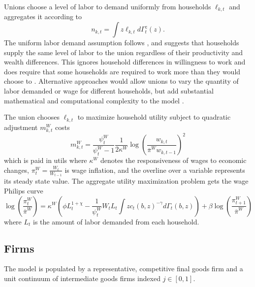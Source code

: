 Unions choose a level of labor to demand uniformly from households $\ell_{k, t}$ and aggregates it according to
\begin{equation*}
    n_{k, t} = \int z \ell_{k, t} d \Gamma_t^z (z).
\end{equation*}
The uniform labor demand assumption follows \textcite{auclert2023mpcs}, and suggests that households supply the same level of labor to the union regardless of their productivity and wealth differences. This ignores household differences in willingness to work and does require that some households are required to work more than they would choose to \autocite{gerke2024household}. Alternative approaches would allow unions to vary the quantity of labor demanded or wage for different households, but add substantial mathematical and computational complexity to the model \autocite{gerke2024household}.

The union chooses $\ell_{k, t}$ to maximize household utility subject to quadratic adjustment $m_{k, t}^W$ costs
\begin{equation*}
    m_{k, t}^W = \frac{\psi_t^W}{\psi_t^W - 1} \frac{1}{2 \kappa^W} \log\left(\frac{w_{k, t}}{\overline{\pi}^W w_{k, t-1}}\right)^2
\end{equation*}
which is paid in utils where $\kappa^W$ denotes the responsiveness of wages to economic changes, $\pi_t^W = \frac{W_t}{W_{t-1}}$ is wage inflation, and the overline over a variable represents its steady state value. The aggregate utility maximization problem gets the wage Philips curve
\begin{equation*}
    \log\left(\frac{\pi_t^W}{\overline{\pi}^W}\right) = \kappa^W \left( \phi L_t^{1 + \chi} - \frac{1}{\psi_t^W} W_t L_t \int z c_t(b, z)^{-\gamma} d\Gamma_t(b, z)\right) + \beta \log\left(\frac{\pi_{t+1}^W}{\overline{\pi}^W}\right)
\end{equation*}
where $L_t$ is the amount of labor demanded from each household.


\subsection{Firms} \label{subsec:firms}

The model is populated by a representative, competitive final goods firm and a unit continuum of intermediate goods firms indexed $j \in [0, 1]$.

